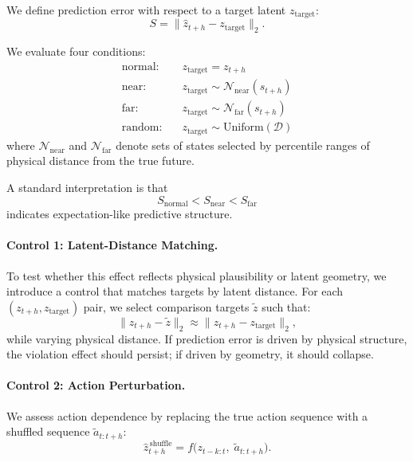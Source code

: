 \documentclass[10pt,twocolumn]{article}
\begin{document}
We define prediction error with respect to a target latent $z_{\text{target}}$:
\begin{equation}
S = \|\hat{z}_{t+h} - z_{\text{target}}\|_2.
\end{equation}

We evaluate four conditions:
\begin{align*}
\text{normal:} &\quad z_{\text{target}} = z_{t+h} \\
\text{near:} &\quad z_{\text{target}} \sim \mathcal{N}_{\text{near}}(s_{t+h}) \\
\text{far:} &\quad z_{\text{target}} \sim \mathcal{N}_{\text{far}}(s_{t+h}) \\
\text{random:} &\quad z_{\text{target}} \sim \text{Uniform}(\mathcal{D})
\end{align*}
where $\mathcal{N}_{\text{near}}$ and $\mathcal{N}_{\text{far}}$ denote sets of states selected by percentile ranges of physical distance from the true future.

A standard interpretation is that
\begin{equation}
S_{\text{normal}} < S_{\text{near}} < S_{\text{far}}
\end{equation}
indicates expectation-like predictive structure.

\paragraph{Control 1: Latent-Distance Matching.}
To test whether this effect reflects physical plausibility or latent geometry, we introduce a control that matches targets by latent distance. For each $(z_{t+h}, z_{\text{target}})$ pair, we select comparison targets $\tilde{z}$ such that:
\begin{equation}
\|z_{t+h} - \tilde{z}\|_2 \approx \|z_{t+h} - z_{\text{target}}\|_2,
\end{equation}
while varying physical distance. If prediction error is driven by physical structure, the violation effect should persist; if driven by geometry, it should collapse.

\paragraph{Control 2: Action Perturbation.}
We assess action dependence by replacing the true action sequence with a shuffled sequence $\tilde{a}_{t:t+h}$:
\begin{equation}
\hat{z}_{t+h}^{\,\text{shuffle}} = f\big(z_{t-k:t},\; \tilde{a}_{t:t+h}\big).
\end{equation}
\end{document}
